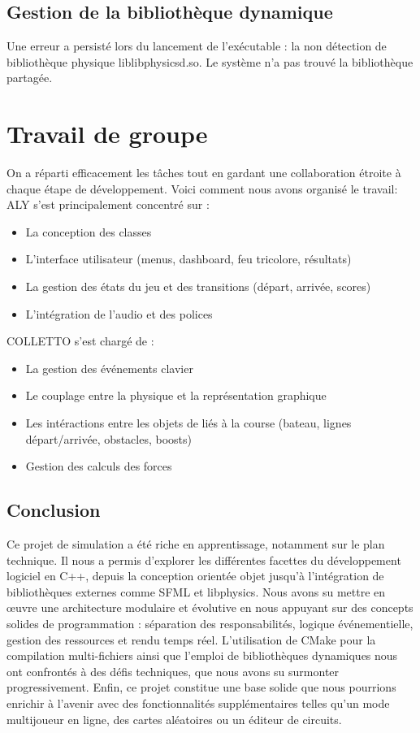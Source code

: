 \documentclass[a4paper,margin=1cm,11pt]{report}
\begin{document}
\section{Gestion de la bibliothèque dynamique}
Une erreur a persisté lors du lancement de l'exécutable : la non détection de bibliothèque physique liblibphysicsd.so. Le système n’a pas trouvé la bibliothèque partagée.

\chapter{Travail de groupe}
On a réparti efficacement les tâches tout en gardant une collaboration étroite à chaque étape de développement. Voici comment nous avons organisé le travail:\\
ALY s’est principalement concentré sur :
\begin{itemize}
	\item La conception des classes
	\item L’interface utilisateur (menus, dashboard, feu tricolore, résultats)
	\item La gestion des états du jeu et des transitions (départ, arrivée, scores)
	\item L’intégration de l’audio et des polices\\
\end{itemize}
COLLETTO s’est chargé de :
\begin{itemize}
	\item La gestion des événements clavier
	\item Le couplage entre la physique et la représentation graphique
	\item Les intéractions entre les objets de liés à la course (bateau, lignes départ/arrivée, obstacles, boosts)
	\item Gestion des calculs des forces
\end{itemize}

\newpage
\section*{Conclusion}
Ce projet de simulation a été riche en apprentissage, notamment sur le plan technique. Il nous a permis d’explorer les différentes facettes du développement logiciel en C++, depuis la conception orientée objet jusqu’à l’intégration de bibliothèques externes comme SFML et libphysics. 
Nous avons su mettre en œuvre une architecture modulaire et évolutive en nous appuyant sur des concepts solides de programmation : séparation des responsabilités, logique événementielle, gestion des ressources et rendu temps réel. L’utilisation de CMake pour la compilation multi-fichiers ainsi que l’emploi de bibliothèques dynamiques nous ont confrontés à des défis techniques, que nous avons su surmonter progressivement.
Enfin, ce projet constitue une base solide que nous pourrions enrichir à l’avenir avec des fonctionnalités supplémentaires telles qu’un mode multijoueur en ligne, des cartes aléatoires ou un éditeur de circuits.
\end{document}
